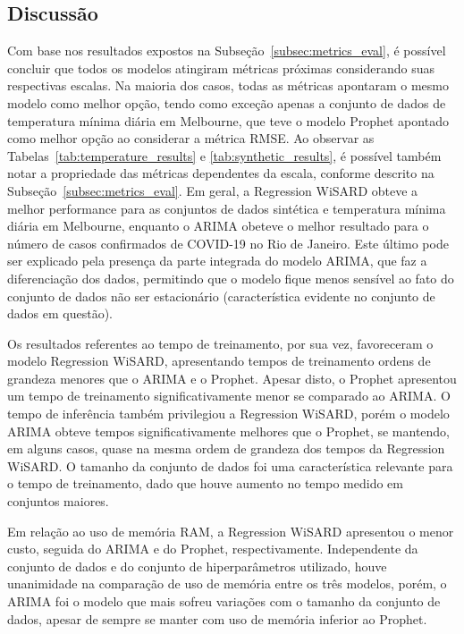 \FloatBarrier

\subsection{Discussão}
Com base nos resultados expostos na Subseção~\ref{subsec:metrics_eval}, é possível concluir que todos os modelos atingiram métricas próximas considerando suas respectivas escalas. Na maioria dos casos, todas as métricas apontaram o mesmo modelo como melhor opção, tendo como exceção apenas a conjunto de dados de temperatura mínima diária em Melbourne, que teve o modelo Prophet apontado como melhor opção ao considerar a métrica RMSE. Ao observar as Tabelas~\ref{tab:temperature_results} e \ref{tab:synthetic_results}, é possível também notar a propriedade das métricas dependentes da escala, conforme descrito na Subseção~\ref{subsec:metrics_eval}. Em geral, a Regression WiSARD obteve a melhor performance para as conjuntos de dados sintética e temperatura mínima diária em Melbourne, enquanto o ARIMA obeteve o melhor resultado para o número de casos confirmados de COVID-19 no Rio de Janeiro. Este último pode ser explicado pela presença da parte integrada do modelo ARIMA, que faz a diferenciação dos dados, permitindo que o modelo fique menos sensível ao fato do conjunto de dados não ser estacionário (característica evidente no conjunto de dados em questão).

Os resultados referentes ao tempo de treinamento, por sua vez, favoreceram o modelo Regression WiSARD, apresentando tempos de treinamento ordens de grandeza menores que o ARIMA e o Prophet. Apesar disto, o Prophet apresentou um tempo de treinamento significativamente menor se comparado ao ARIMA. O tempo de inferência também privilegiou a Regression WiSARD, porém o modelo ARIMA obteve tempos significativamente melhores que o Prophet, se mantendo, em alguns casos, quase na mesma ordem de grandeza dos tempos da Regression WiSARD. O tamanho da conjunto de dados foi uma característica relevante para o tempo de treinamento, dado que houve aumento no tempo medido em conjuntos maiores.

Em relação ao uso de memória RAM, a Regression WiSARD apresentou o menor custo, seguida do ARIMA e do Prophet, respectivamente. Independente da conjunto de dados e do conjunto de hiperparâmetros utilizado, houve unanimidade na comparação de uso de memória entre os três modelos, porém, o ARIMA foi o modelo que mais sofreu variações com o tamanho da conjunto de dados, apesar de sempre se manter com uso de memória inferior ao Prophet.